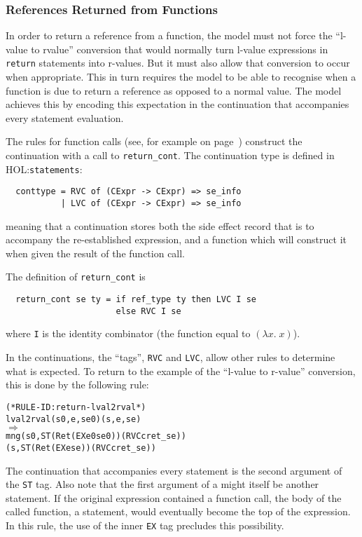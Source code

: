 \documentclass[11pt]{article}
\newcommand{\HOLfile}[1]{HOL:\texttt{#1}}
\begin{document}
\subsubsection{References Returned from Functions}
\label{sec:refs-returned-from-fns}

In order to return a reference from a function, the model must not
force the ``l-value to rvalue'' conversion that would normally turn
l-value expressions in \texttt{return} statements into r-values.  But
it must also allow that conversion to occur when appropriate.  This in
turn requires the model to be able to recognise when a function is due
to return a reference as opposed to a normal value.  The model
achieves this by encoding this expectation in the continuation that
accompanies every statement evaluation.

%
The rules for function calls (see, for example
 on
page~\pageref{rule:global-function-call}) construct the continuation
with a call to \texttt{return_cont}.  The continuation type is defined
in \HOLfile{statements}:
\begin{verbatim}
  conttype = RVC of (CExpr -> CExpr) => se_info
           | LVC of (CExpr -> CExpr) => se_info
\end{verbatim}
meaning that a continuation stores both the side effect record that is
to accompany the re-established expression, and a function which will
construct it when given the result of the function call.

The definition of \texttt{return_cont} is
\begin{verbatim}
  return_cont se ty = if ref_type ty then LVC I se
                      else RVC I se
\end{verbatim}
where \texttt{I} is the identity combinator (the function equal to
$(\lambda x.\;x)$).

In the continuations, the ``tags'', \texttt{RVC} and \texttt{LVC},
allow other rules to determine what is expected.  To return to the
example of the ``l-value to r-value'' conversion, this is done by the
following rule:
\begin{center}
\begin{minipage}{\textwidth}
%
%
\begin{alltt}
(* RULE-ID: return-lval2rval *)
     lval2rval (s0,e,se0) (s,e,se)
   \(\Rightarrow\)
     mng (s0, ST (Ret (EX e0 se0)) (RVC c ret_se))
         (s, ST (Ret (EX e se)) (RVC c ret_se))
\end{alltt}
\end{minipage}
\end{center}
The continuation that accompanies every statement is the second
argument of the \texttt{ST} tag. Also note that the first argument of
a  might itself be another statement.  If the original
expression contained a function call, the body of the called function,
a statement, would eventually become the top of the expression.  In
this rule, the use of the inner \texttt{EX} tag precludes this
possibility.
\end{document}
